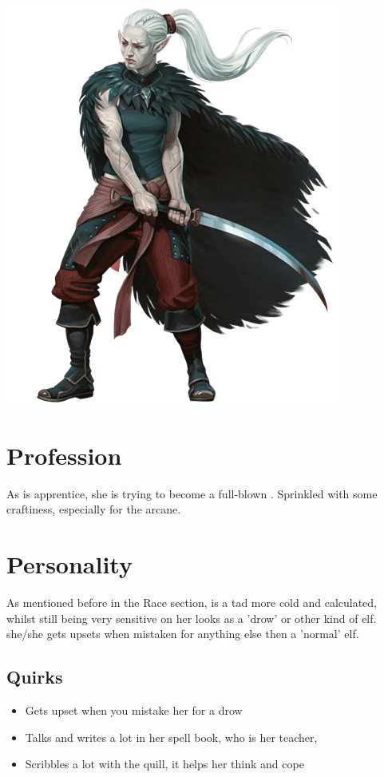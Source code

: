     \vfill
    \includegraphics[width=\linewidth-2ex]{images/shadar-kai.png}
    \vfill
    \newpage

    \section{Profession}
    As \Name{} is \Master{} apprentice, she is trying to become a full-blown \Class{}. Sprinkled with some craftiness, especially for the arcane.

    \section{Personality}
    As mentioned before in the Race section, \Name{} is a tad more cold and calculated, whilst still being very sensitive on her looks as a 'drow' or other kind of elf. she/she gets upsets when mistaken for anything else then a 'normal' elf.

    \subsection{Quirks}
    \begin{itemize}
        \item Gets upset when you mistake her for a drow
        \item Talks and writes a lot in her spell book, who is her teacher, \Master
        \item Scribbles a lot with the quill, it helps her think and cope
    \end{itemize}

